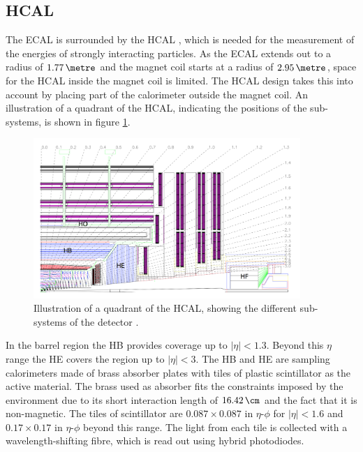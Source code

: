 \subsection{\acl{HCAL}}
\label{sec:CMSLHC_CMS_hcal}
The \ac{ECAL} is surrounded by the \ac{HCAL} \cite{cms-jinst}, which is needed for the
measurement of the energies of strongly interacting particles. As
the \ac{ECAL} extends out to a radius of $1.77\,\metre$ and the magnet coil
starts at a radius of $2.95\,\metre$, space for the \ac{HCAL} inside the magnet
coil is limited. The \ac{HCAL} design takes
this into account by placing part of the calorimeter outside the magnet coil. An
illustration of a quadrant of the
\ac{HCAL}, indicating the positions of the sub-systems, is shown
in figure \ref{fig:CMS_HCAL}.

\begin{figure}[h!]
\begin{center}
\includegraphics[width=0.9\textwidth]{./Detector/Plots/HCAL.png}
\caption[Illustration of a quadrant of the HCAL, showing the different
sub-systems of the detector.]{Illustration of a quadrant of the \ac{HCAL}, showing the different
sub-systems of the detector \cite{cms-jinst}.}
\label{fig:CMS_HCAL}
\end{center}
\end{figure}

In the barrel region the \ac{HB} provides
coverage up to $|\eta|<1.3$. Beyond this $\eta$ range the \ac{HE} covers
the region up to $|\eta|<3$. The \ac{HB} and \ac{HE} are sampling calorimeters made of brass absorber
plates with tiles of plastic scintillator as the active material. The brass used as 
absorber fits the constraints imposed by the environment due to its short interaction length
of $16.42\,\cm$ and the fact that it is non-magnetic. The tiles of scintillator 
are $0.087 \times 0.087$ in $\eta$-$\phi$ for $|\eta|<1.6$ and $0.17\times0.17$ in $\eta$-$\phi$
beyond this range. The light from each tile is collected with a wavelength-shifting fibre, 
which is read out using hybrid photodiodes. 

